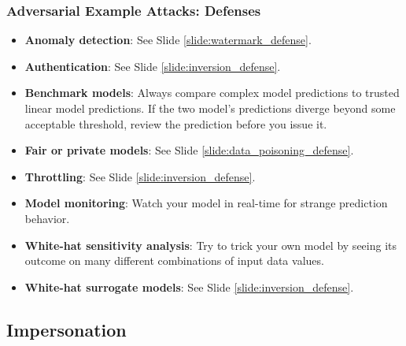 \documentclass[11pt,
               aspectratio=169,
               hyperref={colorlinks}
               ]{beamer}
\begin{document}
			\begin{frame}
		
				\frametitle{Adversarial Example Attacks: \textbf{Defenses}}		
				\small
				\begin{itemize}
					\item \textbf{Anomaly detection}: See Slide \ref{slide:watermark_defense}. 
					\item \textbf{Authentication}: See Slide \ref{slide:inversion_defense}. 
					\item \textbf{Benchmark models}: Always compare complex model predictions to trusted linear model predictions. If the two model’s predictions diverge beyond some acceptable threshold, review the prediction before you issue it.
					\item \textbf{Fair or private models}: See Slide \ref{slide:data_poisoning_defense}.
					\item \textbf{Throttling}: See Slide \ref{slide:inversion_defense}. 
					\item \textbf{Model monitoring}: Watch your model in real-time for strange prediction behavior.
					\item \textbf{White-hat sensitivity analysis}: Try to trick your own model by seeing its outcome on many different combinations of input data values.
					\item \textbf{White-hat surrogate models}: See Slide \ref{slide:inversion_defense}. 
				\end{itemize}
				\normalsize
			\end{frame}

		\subsection{Impersonation}
\end{document}
